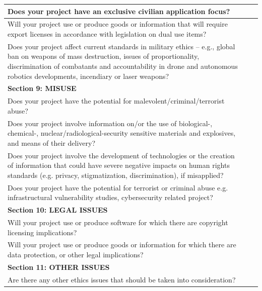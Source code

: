 \documentclass[11pt,twoside]{report}
\begin{document}
\begin{longtable}{ |p{13.2cm}|p{0.6cm}|p{0.6cm}| }
	Does your project have an exclusive civilian application focus? & \checkmark & \\
	\hline
	
	Will your project use or produce goods or information that will require export licenses in accordance with legislation on dual use items? & & \checkmark \\
	\hline
	
	Does your project affect current standards in military ethics – e.g., global ban on weapons of mass destruction, issues of proportionality, discrimination of combatants and accountability in drone and autonomous robotics developments, incendiary or laser weapons? & & \checkmark \\
	\hline
	
	\multicolumn{3}{|l|}{\cellcolor{green!25}\bf Section 9: MISUSE} \\
	\hline
	
	Does your project have the potential for malevolent/criminal/terrorist abuse? & & \checkmark \\
	\hline
	
	Does your project involve information on/or the use of biological-, chemical-, nuclear/radiological-security sensitive materials and explosives, and means of their delivery? & \checkmark & \\
	\hline
	
	Does your project involve the development of technologies or the creation of information that could have severe negative impacts on human rights standards (e.g. privacy, stigmatization, discrimination), if misapplied? & & \checkmark \\
	\hline
	
	Does your project have the potential for terrorist or criminal abuse e.g. infrastructural vulnerability studies, cybersecurity related project? & & \checkmark \\
	\hline
	
	\multicolumn{3}{|l|}{\cellcolor{green!25}\bf Section 10: LEGAL ISSUES} \\
	\hline
	
	Will your project use or produce software for which there are copyright licensing implications? & & \checkmark \\
	\hline
	
	Will your project use or produce goods or information for which there are data protection, or other legal implications? & & \checkmark \\
	\hline
	
	\multicolumn{3}{|l|}{\cellcolor{green!25}\bf Section 11: OTHER ISSUES} \\
	\hline
	
	Are there any other ethics issues that should be taken into consideration? & & \checkmark \\
	\hline
	
\end{longtable}
\end{document}
